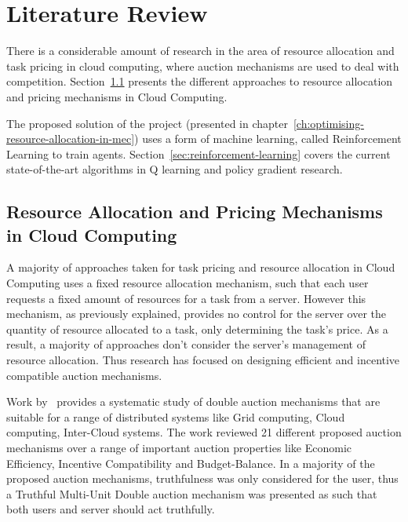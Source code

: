 \chapter{Literature Review}
\label{ch:literature-review}
There is a considerable amount of research in the area of resource allocation and task pricing in cloud computing,
where auction mechanisms are used to deal with competition.
Section~\ref{sec:resource-allocation-and-pricing-in-cloud-computing} presents the different approaches to resource
allocation and pricing mechanisms in Cloud Computing.

The proposed solution of the project (presented in chapter~\ref{ch:optimising-resource-allocation-in-mec}) uses a form
of machine learning, called Reinforcement Learning to train agents. Section~\ref{sec:reinforcement-learning} covers the
current state-of-the-art algorithms in Q learning and policy gradient research.

\section{Resource Allocation and Pricing Mechanisms in Cloud Computing}
\label{sec:resource-allocation-and-pricing-in-cloud-computing}
A majority of approaches taken for task pricing and resource allocation in Cloud Computing uses a fixed resource
allocation mechanism, such that each user requests a fixed amount of resources for a task from a server. However this
mechanism, as previously explained, provides no control for the server over the quantity of resource allocated to a task,
only determining the task's price. As a result, a majority of approaches don't consider the server's management of
resource allocation. Thus research has focused on designing efficient and incentive compatible auction mechanisms.

Work by~\cite{KUMAR2017234} provides a systematic study of double auction mechanisms that are suitable for a range
of distributed systems like Grid computing, Cloud computing, Inter-Cloud systems. The work reviewed 21 different
proposed auction mechanisms over a range of important auction properties like Economic Efficiency,
Incentive Compatibility and Budget-Balance. In a majority of the proposed auction mechanisms, truthfulness was only
considered for the user, thus a Truthful Multi-Unit Double auction mechanism was presented as such that both users and
server should act truthfully.

